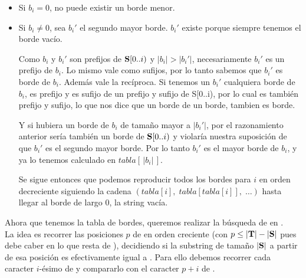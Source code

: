 \begin{itemize}
    \item Si $b_i = 0$, no puede existir un borde menor.
    \item Si $b_i \neq 0$, sea $b_i'$ el segundo mayor borde. $b_i'$ existe porque siempre tenemos el borde vacío.

        Como $b_i$ y $b_i'$ son prefijos de $\textbf{S}[0..i)$ y $|b_i| > |b_i'|$, necesariamente $b_i'$ es un prefijo de $b_i$. Lo mismo vale como sufijos, por lo tanto sabemos que $b_i'$ es borde de $b_i$.
        Además vale la recíproca. Si tenemos un $b_i'$ cualquiera borde de $b_i$, es prefijo y es sufijo de un prefijo y sufijo de S[0..i), por lo cual es también prefijo y sufijo, lo que nos dice que un borde de un borde, tambien es borde.

        Y si hubiera un borde de $b_i$ de tamaño mayor a $|b_i'|$, por el razonamiento anterior sería también un borde de $\textbf{S}[0..i)$ y violaría nuestra suposición de que $b_i'$ es el segundo mayor borde. Por lo tanto $b_i'$ es el mayor borde de $b_i$, y ya lo tenemos calculado en $tabla[ \,|b_i|\, ]$.

        Se sigue entonces que podemos reproducir todos los bordes para $i$ en orden decreciente siguiendo la cadena $(tabla[i], \; tabla[tabla[i]], \; \ldots)$ hasta llegar al borde de largo 0, la string vacía.

\end{itemize}

\vspace*{1em}

Ahora que tenemos la tabla de bordes, queremos realizar la búsqueda de \sS en \sT.
\\

La idea es recorrer las posiciones $p$ de \sT en orden creciente (con $p \leq |\textbf{T}| - |\textbf{S}|$ pues \sS debe caber en lo que resta de \sT), decidiendo si la substring de tamaño $|\textbf{S}|$ a partir de esa posición es efectivamente igual a \sS. Para ello debemos recorrer cada caracter $i$-ésimo de \sS y compararlo con el caracter $p+i$ de \sT.

